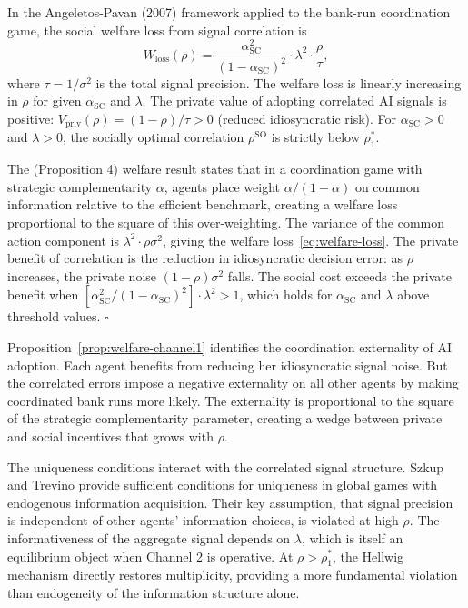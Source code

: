 \begin{proposition}\label{prop:welfare-channel1}
  In the Angeletos-Pavan (2007) framework applied to the bank-run coordination game, the social welfare loss from signal correlation is
  \begin{equation}\label{eq:welfare-loss}
    W_{\text{loss}}(\rho) = \frac{\alpha_{\text{SC}}^2}{(1-\alpha_{\text{SC}})^2} \cdot \lambda^2 \cdot \frac{\rho}{\tau},
  \end{equation}
  where $\tau = 1/\sigma^2$ is the total signal precision. The welfare loss is linearly increasing in $\rho$ for given $\alpha_{\text{SC}}$ and $\lambda$. The private value of adopting correlated AI signals is positive: $V_{\text{priv}}(\rho) = (1-\rho)/\tau > 0$ (reduced idiosyncratic risk). For $\alpha_{\text{SC}} > 0$ and $\lambda > 0$, the socially optimal correlation $\rho^{\text{SO}}$ is strictly below $\rho_1^*$.

   The \citet{angeletos2007} (Proposition 4) welfare result states that in a coordination game with strategic complementarity $\alpha$, agents place weight $\alpha/(1-\alpha)$ on common information relative to the efficient benchmark, creating a welfare loss proportional to the square of this over-weighting. The variance of the common action component is $\lambda^2 \cdot \rho\sigma^2$, giving the welfare loss~\eqref{eq:welfare-loss}. The private benefit of correlation is the reduction in idiosyncratic decision error: as $\rho$ increases, the private noise $(1-\rho)\sigma^2$ falls. The social cost exceeds the private benefit when $[\alpha_{\text{SC}}^2/(1-\alpha_{\text{SC}})^2] \cdot \lambda^2 > 1$, which holds for $\alpha_{\text{SC}}$ and $\lambda$ above threshold values. $\square$
\end{proposition}

Proposition~\ref{prop:welfare-channel1} identifies the coordination externality of AI adoption. Each agent benefits from reducing her idiosyncratic signal noise. But the correlated errors impose a negative externality on all other agents by making coordinated bank runs more likely. The externality is proportional to the square of the strategic complementarity parameter, creating a wedge between private and social incentives that grows with $\rho$.

The \citet{szkup2015} uniqueness conditions interact with the correlated signal structure. Szkup and Trevino provide sufficient conditions for uniqueness in global games with endogenous information acquisition. Their key assumption, that signal precision is independent of other agents' information choices, is violated at high $\rho$. The informativeness of the aggregate signal depends on $\lambda$, which is itself an equilibrium object when Channel 2 is operative. At $\rho > \rho_1^*$, the Hellwig mechanism directly restores multiplicity, providing a more fundamental violation than endogeneity of the information structure alone.

